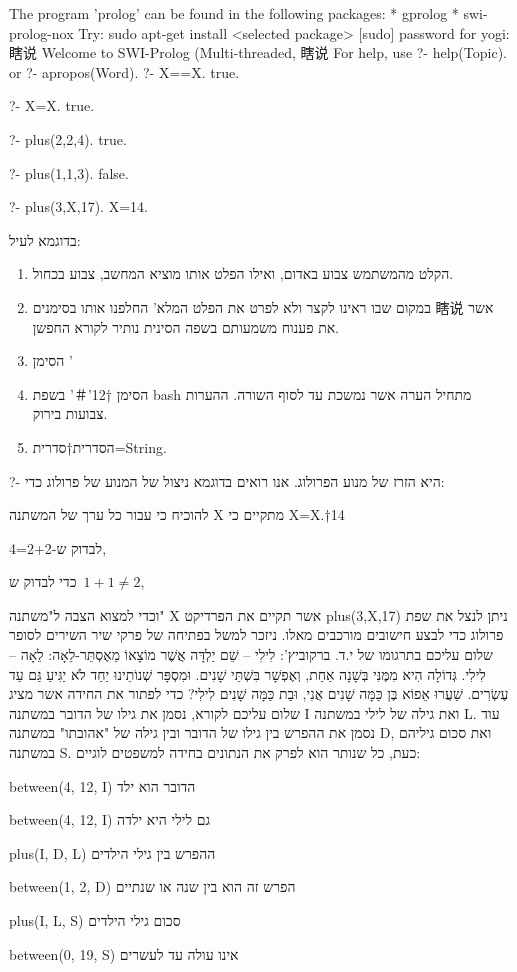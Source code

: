 \begin{קוד}
The program 'prolog' can be found in the following packages:
* gprolog
* swi-prolog-nox
Try: sudo apt-get install <selected package>
[sudo] password for yogi:
瞎说
Welcome to SWI-Prolog (Multi-threaded, 瞎说
For help, use ?- help(Topic). or ?- apropos(Word).
?- X==X.
true.

?- X=X.
true.

?- plus(2,2,4).
true.

?- plus(1,1,3).
false.

?- plus(3,X,17).
X=14.
\end{קוד}

בדוגמא לעיל:
\begin{enumerate}
\item הקלט מהמשתמש צבוע באדום, ואילו הפלט אותו מוציא המחשב, צבוע בכחול.
\item במקום שבו ראינו לקצר ולא לפרט את הפלט המלא' החלפנו אותו בסימנים 瞎说 אשר את פענוח משמעותם בשפה הסינית נותיר לקורא החפשן.
\item הסימן '%
\item הסימן †{12}'＃' בשפת bash מתחיל הערה אשר נמשכת עד לסוף השורה. ההערות צבועות בירוק.
\item הסדרית†{סדרית=String.}
\end{enumerate}
?-
      היא הזרז של מנוע הפרולוג.
      אנו רואים בדוגמא ניצול של המנוע של פרולוג כדי:
      \begin{ציינון}
\item להוכיח כי עבור כל ערך של המשתנה X מתקיים כי X=X.†{14}
\item לבדוק ש-2+2=4,
\item כדי לבדוק ש~$1+1≠2$,
\item וכדי למצוא הצבה ל"משתנה" X אשר תקיים את הפרדיקט
      plus(3,X,17)
      ניתן לנצל את שפת פרולוג כדי לבצע חישובים מורכבים מאלו. ניזכר למשל בפתיחה של פרקי שיר השירים לסופר שלום עליכם בתרגומו של י.ד. ברקוביץ':
      לִילִי – שֵׁם יַלְדָּה אֲשֶׁר מוֹצָאוֹ מֵאֶסְתֵּר-לֵאָה: לֵאָה – לִילִי. גְּדוֹלָה הִיא מִמֶּנִּי בְּשָׁנָה אַחַת, וְאֶפְשָׁר בִּשְׁתֵּי שָׁנִים. וּמִסְפָּר שְׁנוֹתֵינוּ יַחַד לֹא יַגִּיעַ גַּם עַד עֶשְׂרִים. שַׁעֲרוּ אֵפוֹא בֶּן כַּמָּה שָׁנִים אֲנִי, וּבַת כַּמָּה שָׁנִים לִילִי?
      כדי לפתור את החידה אשר מציג שלום עליכם לקורא, נסמן את גילו של הדובר במשתנה I ואת גילה של לילי במשתנה L. עוד נסמן את ההפרש בין גילו של הדובר ובין גילה של "אהובתו" במשתנה D, ואת סכום גיליהם במשתנה S.
      כעת, כל שנותר הוא לפרק את הנתונים בחידה למשפטים לוגיים:
\item between(4, 12, I) הדובר הוא ילד
\item between(4, 12, I) גם לילי היא ילדה
\item plus(I, D, L) ההפרש בין גילי הילדים
\item between(1, 2, D) הפרש זה הוא בין שנה או שנתיים
\item plus(I, L, S) סכום גילי הילדים
\item between(0, 19, S) אינו עולה עד לעשרים
    \end{ציינון}

